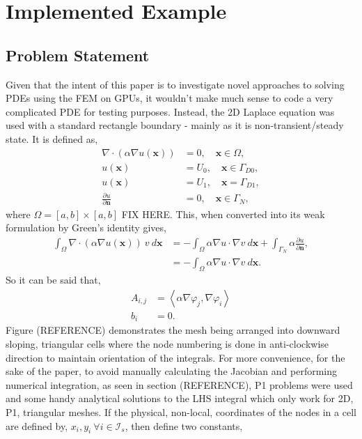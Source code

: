 \section{Implemented Example}

\subsection{Problem Statement}
	Given that the intent of this paper is to investigate novel approaches to solving PDEs using the FEM on GPUs, it wouldn't make much sense to code a very complicated PDE for testing purposes. Instead, the 2D Laplace equation was used with a standard rectangle boundary -  mainly as it is non-transient/steady state. It is defined as,
\begin{align}
	\nabla\cdot(\alpha\nabla u(\mathbf{x})) &= 0,\quad \mathbf{x}\in \Omega, \\
	u(\mathbf{x}) &= U_0,\quad \mathbf{x} \in \Gamma_{D0},\\
	u(\mathbf{x}) &= U_1,\quad \mathbf{x} = \Gamma_{D1},\\
	\frac{\partial u}{\partial \mathbf{n}} &= 0,\quad \mathbf{x} \in {\Gamma_N},
\end{align}
where $\Omega = [a,b]\times[a,b]$ FIX HERE. This, when converted into its weak formulation by Green's identity gives,
\begin{align}
	\int_\Omega \nabla\cdot(\alpha\nabla u(\mathbf{x}))~v~d\mathbf{x} &= -\int_\Omega \alpha\nabla u \cdot \nabla v~d\mathbf{x} + \int_{\Gamma_N} \alpha \frac{\partial u}{\partial \mathbf{n}},\\
	&= -\int_\Omega \alpha\nabla u \cdot \nabla v~d\mathbf{x}.
\end{align}
So it can be said that,
\begin{align}
	A_{i,j} &= \left\langle \alpha \nabla \varphi_j, \nabla \varphi_i\right\rangle\\
	b_i &= 0.
\end{align}
Figure (REFERENCE) demonstrates the mesh being arranged into downward sloping, triangular cells where the node numbering is done in anti-clockwise direction to maintain orientation of the integrals. For more convenience, for the sake of the paper, to avoid manually calculating the Jacobian and performing numerical integration, as seen in section (REFERENCE), P1 problems were used and some handy analytical solutions to the LHS integral which only work for 2D, P1, triangular meshes. If the physical, non-local, coordinates of the nodes in a cell are defined by, $x_i, y_i~\forall i \in \mathcal{I}_s$, then define two constants,
